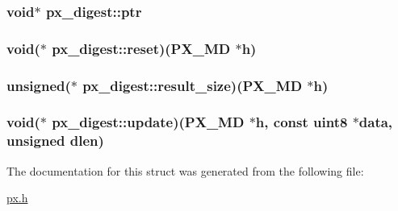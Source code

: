 \hypertarget{structpx__digest_acd8a79cac2b6b57525e8feb4c492db11}{
\subsubsection[{ptr}]{\setlength{\rightskip}{0pt plus 5cm}void$\ast$ px\-\_\-digest\-::ptr}}\label{structpx__digest_acd8a79cac2b6b57525e8feb4c492db11}
\hypertarget{structpx__digest_a72f538447abc9a94dd7d9ef52ae6327a}{
\subsubsection[{reset}]{\setlength{\rightskip}{0pt plus 5cm}void($\ast$ px\-\_\-digest\-::reset)({\bf P\-X\-\_\-\-M\-D} $\ast$h)}}\label{structpx__digest_a72f538447abc9a94dd7d9ef52ae6327a}
\hypertarget{structpx__digest_a02a702a5d459e7f985658d9c217112c4}{
\subsubsection[{result\-\_\-size}]{\setlength{\rightskip}{0pt plus 5cm}unsigned($\ast$ px\-\_\-digest\-::result\-\_\-size)({\bf P\-X\-\_\-\-M\-D} $\ast$h)}}\label{structpx__digest_a02a702a5d459e7f985658d9c217112c4}
\hypertarget{structpx__digest_ada9f7ff6923761ddb991bf6bf0ed4ba3}{
\subsubsection[{update}]{\setlength{\rightskip}{0pt plus 5cm}void($\ast$ px\-\_\-digest\-::update)({\bf P\-X\-\_\-\-M\-D} $\ast$h, const {\bf uint8} $\ast$data, unsigned dlen)}}\label{structpx__digest_ada9f7ff6923761ddb991bf6bf0ed4ba3}


The documentation for this struct was generated from the following file\-:\begin{DoxyCompactItemize}
\item 
\hyperlink{px_8h}{px.\-h}\end{DoxyCompactItemize}
